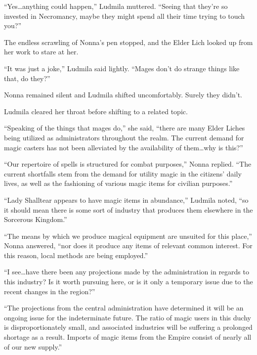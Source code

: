  

“Yes…anything could happen,” Ludmila muttered. “Seeing that they’re so invested in Necromancy, maybe they might spend all their time trying to touch you?”

 

The endless scrawling of Nonna’s pen stopped, and the Elder Lich looked up from her work to stare at her.

 

“It was just a joke,” Ludmila said lightly. “Mages don’t do strange things like that, do they?”

 

Nonna remained silent and Ludmila shifted uncomfortably. Surely they didn’t.

 

Ludmila cleared her throat before shifting to a related topic.

 

“Speaking of the things that mages do,” she said, “there are many Elder Liches being utilized as administrators throughout the realm. The current demand for magic casters has not been alleviated by the availability of them…why is this?”

 

“Our repertoire of spells is structured for combat purposes,” Nonna replied. “The current shortfalls stem from the demand for utility magic in the citizens’ daily lives, as well as the fashioning of various magic items for civilian purposes.”

 

“Lady Shalltear appears to have magic items in abundance,” Ludmila noted, “so it should mean there is some sort of industry that produces them elsewhere in the Sorcerous Kingdom.”

 

“The means by which we produce magical equipment are unsuited for this place,” Nonna answered, “nor does it produce any items of relevant common interest. For this reason, local methods are being employed.”

 

“I see…have there been any projections made by the administration in regards to this industry? Is it worth pursuing here, or is it only a temporary issue due to the recent changes in the region?”

 

“The projections from the central administration have determined it will be an ongoing issue for the indeterminate future. The ratio of magic users in this duchy is disproportionately small, and associated industries will be suffering a prolonged shortage as a result. Imports of magic items from the Empire consist of nearly all of our new supply.”

